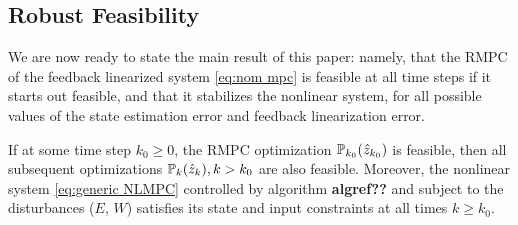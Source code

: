 \subsection{Robust Feasibility}

We are now ready to state the main result of this paper: namely, that the RMPC of the feedback linearized system \eqref{eq:nom mpc} is feasible at all time steps if it starts out feasible, and that it stabilizes the nonlinear system, for all possible values of the state estimation error and feedback linearization error.

\begin{theorem}[Feasibility]
\label{th:robust_feas}
If at some time step $k_0 \geq 0$, the RMPC optimization $\mathbb{P}_{k_0}(\hat{z}_{k_0})$ is feasible, then all subsequent optimizations  $\mathbb{P}_{k}(\hat{z}_{k}), k> k_0$ are also feasible.
Moreover, the nonlinear system \eqref{eq:generic NLMPC} controlled by algorithm \textbf{algref??} and subject to the disturbances ($E$, $W$) satisfies its state and input constraints at all times $k \geq k_0$.
\end{theorem}
